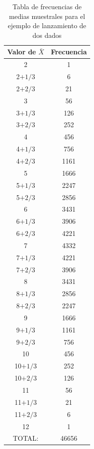 \begin{ejemplo}
    \begin{table}[hp]
        \begin{center}
        {\small
        \begin{tabular}{|c|c|}
        \hline
        {\bf Valor de $\bar X$}\rule{0cm}{0.7cm}&{\bf Frecuencia}\\
        \hline
        2& 1 \\ \hline
        2$+1/3$\rule{0cm}{0.35cm}&6 \\ \hline
        2$+2/3$\rule{0cm}{0.35cm}& 21 \\ \hline
        3&56 \\ \hline
        3$+1/3$\rule{0cm}{0.35cm}&126 \\ \hline
        3$+2/3$\rule{0cm}{0.35cm}&252 \\ \hline
        4& 456 \\ \hline
        4$+1/3$\rule{0cm}{0.35cm}&756 \\ \hline
        4$+2/3$\rule{0cm}{0.35cm}& 1161 \\ \hline
        5&1666 \\ \hline
        5$+1/3$\rule{0cm}{0.35cm}&2247 \\ \hline
        5$+2/3$\rule{0cm}{0.35cm}& 2856 \\ \hline
        6&3431 \\ \hline
        6$+1/3$\rule{0cm}{0.35cm}&3906 \\ \hline
        6$+2/3$\rule{0cm}{0.35cm}& 4221 \\ \hline
        7&4332 \\ \hline
        7$+1/3$\rule{0cm}{0.35cm}&4221 \\ \hline
        7$+2/3$\rule{0cm}{0.35cm}& 3906 \\ \hline
        8&3431 \\ \hline
        8$+1/3$\rule{0cm}{0.35cm}& 2856 \\ \hline
        8$+2/3$\rule{0cm}{0.35cm}& 2247 \\ \hline
        9&1666 \\ \hline
        9$+1/3$\rule{0cm}{0.35cm}& 1161 \\ \hline
        9$+2/3$\rule{0cm}{0.35cm}&756 \\ \hline
        10&456 \\ \hline
        10$+1/3$\rule{0cm}{0.35cm}&252 \\ \hline
        10$+2/3$\rule{0cm}{0.35cm}&126 \\ \hline
        11& 56 \\ \hline
        11$+1/3$\rule{0cm}{0.35cm}& 21 \\ \hline
        11$+2/3$\rule{0cm}{0.35cm}&6 \\ \hline
        12&1 \\ \hline
        TOTAL:&46656\\ \hline
        \end{tabular}
        }
        \end{center}
        \caption{Tabla de frecuencias de medias muestrales para el ejemplo de lanzamiento de dos dados}
        \label{cap06:tabla:TablaFrecuenciasMediasMuestrales}
    \end{table}


\end{ejemplo}
